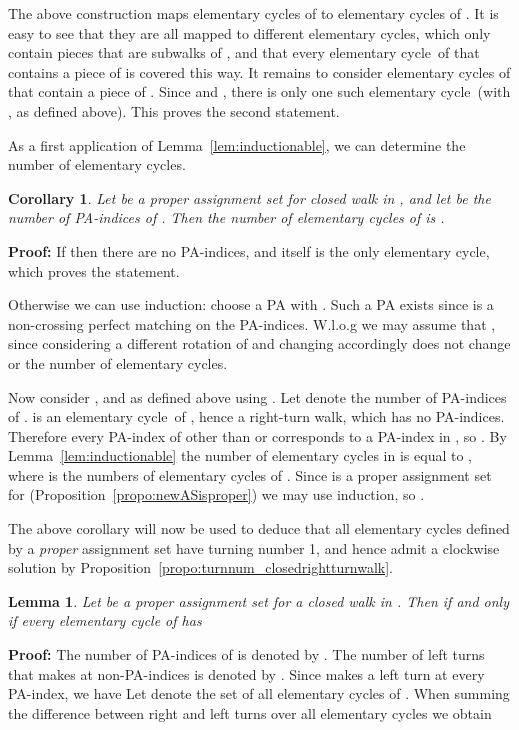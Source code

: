 \documentclass{llncs}
\newcommand{\PF}{{\bf Proof: }}
\newcommand{\QED}{\hspace*{\fill}{}\medskip}
\newcommand{\elcyc}{elementary cycle}
\newtheorem{lem}[thm]{Lemma}
\newtheorem{corol}[thm]{Corollary}
\begin{document}
The above construction maps \elcyc s of  to \elcyc s of . It is easy to see that they are all mapped to different \elcyc s, which only contain pieces that are subwalks of , and that every \elcyc\ of  that contains a piece of  is covered this way. It remains to consider \elcyc s of  that contain a piece of . Since  and , there is only one such \elcyc\  (with , as defined above). This proves the second statement.\QED



As a first application of Lemma~\ref{lem:inductionable}, we can determine the number of \elcyc s.

\begin{corol}
\label{cor:num_elcycs}
Let  be a proper assignment set for closed walk  in , and let  be the number of PA-indices of . Then the number of elementary cycles of  is .
\end{corol}
\PF
If  then there are no PA-indices, and  itself is the only elementary cycle, which proves the statement. 

Otherwise we can use induction: choose a PA  with . Such a PA exists since  is a non-crossing perfect matching on the PA-indices. W.l.o.g we may assume that , since considering a different rotation of  and changing  accordingly does not change  or the number of \elcyc s.
 
Now consider ,  and  as defined above using .
Let  denote the number of PA-indices of .
 is an \elcyc\ of , hence a right-turn walk, which has no PA-indices.
Therefore every PA-index of  other than  or  corresponds to a PA-index in , so .
By Lemma~\ref{lem:inductionable} the number  of \elcyc s in  is equal to , where  is the numbers of \elcyc s of . 
Since  is a proper assignment set for  (Proposition~\ref{propo:newASisproper}) we may use induction, so .
\QED


The above corollary will now be used to deduce that all elementary cycles defined by a {\em proper} assignment set have turning number 1, and hence admit a clockwise solution by Proposition~\ref{propo:turnnum_closedrightturnwalk}.


\begin{lem}
\label{lem:key_counting}
Let  be a proper assignment set for a closed walk  in . Then  if and only if every elementary cycle  of  has 
\end{lem}

\PF
The number of PA-indices of  is denoted by .
The number of left turns that  makes at non-PA-indices is denoted by . Since  makes a left turn at every PA-index, we have 
Let  denote the set of all elementary cycles of .
When summing the difference between right and left turns over all elementary cycles we obtain
\end{document}
